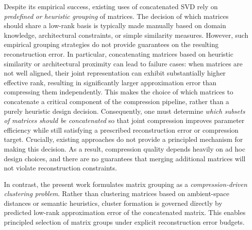 \documentclass[10pt]{article} %
\begin{document}
Despite its empirical success, existing uses of concatenated SVD rely on \emph{predefined or heuristic grouping} of matrices.
The decision of which matrices should share a low-rank basis is typically made manually based on domain knowledge, architectural constraints, or simple similarity measures.
However, such empirical grouping strategies do not provide guarantees on the resulting reconstruction error.
In particular, concatenating matrices based on heuristic similarity or architectural proximity can lead to failure cases: when matrices are not well aligned, their joint representation can exhibit substantially higher effective rank, resulting in significantly larger approximation error than compressing them independently.
This makes the choice of which matrices to concatenate a critical component of the compression pipeline, rather than a purely heuristic design decision.
Consequently, one must determine \emph{which subsets of matrices should be concatenated} so that joint compression improves parameter efficiency while still satisfying a prescribed reconstruction error or compression target.
Crucially, existing approaches do not provide a principled mechanism for making this decision.
As a result, compression quality depends heavily on ad hoc design choices, and there are no guarantees that merging additional matrices will not violate reconstruction constraints.

In contrast, the present work formulates matrix grouping as a \emph{compression-driven clustering problem}.
Rather than clustering matrices based on ambient-space distances or semantic heuristics, cluster formation is governed directly by predicted low-rank approximation error of the concatenated matrix.
This enables principled selection of matrix groups under explicit reconstruction error budgets.

\end{document}
